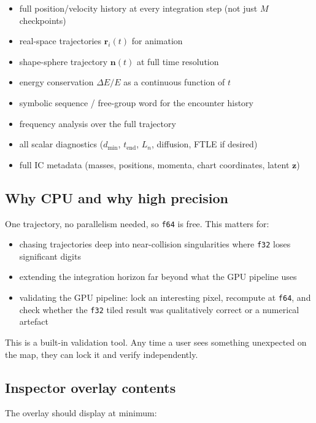 \documentclass[11pt]{report}
\begin{document}
\begin{itemize}[nosep]
\item full position/velocity history at every integration step (not just $M$ checkpoints)
\item real-space trajectories $\mathbf r_i(t)$ for animation
\item shape-sphere trajectory $\mathbf n(t)$ at full time resolution
\item energy conservation $\Delta E/E$ as a continuous function of $t$
\item symbolic sequence / free-group word for the encounter history
\item frequency analysis over the full trajectory
\item all scalar diagnostics ($d_{\min}$, $t_{\mathrm{end}}$, $L_n$, diffusion, FTLE if desired)
\item full IC metadata (masses, positions, momenta, chart coordinates, latent $\mathbf z$)
\end{itemize}

\subsection{Why CPU and why high precision}

One trajectory, no parallelism needed, so \texttt{f64} is free. This matters for:

\begin{itemize}[nosep]
\item chasing trajectories deep into near-collision singularities where \texttt{f32} loses significant digits
\item extending the integration horizon far beyond what the GPU pipeline uses
\item validating the GPU pipeline: lock an interesting pixel, recompute at \texttt{f64}, and check whether the \texttt{f32} tiled result was qualitatively correct or a numerical artefact
\end{itemize}

This is a built-in validation tool. Any time a user sees something unexpected on the map, they can lock it and verify independently.

\subsection{Inspector overlay contents}

The overlay should display at minimum:
\end{document}
